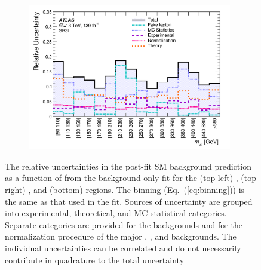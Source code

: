 \begin{figure}[h]
\begin{subfigure}[b]{0.49\textwidth}
      \caption{}
      \label{fig:systSR4l}
    \end{subfigure}
    \hfill
    \begin{subfigure}[b]{0.49\textwidth}
      \centering
      \includegraphics[width=0.98\textwidth]{figs/rpvthreel/systsflat_dist_SROL3l.png}
      \caption{}
      \label{fig:systSR3l}
    \end{subfigure}
    \caption[The relative uncertainties in the post-fit SM background prediction as a function of \mZl from the background-only fit for the (top left) \SRTL, (top right) \SRFour, and (bottom) \SRThree regions.]{The relative uncertainties in the post-fit SM background prediction as a function of \mZl from the background-only fit for the (top left) \SRTL, (top right) \SRFour, and (bottom) \SRThree regions.
    The \mZl binning (Eq.~(\ref{eq:binning})) is the same as that used in the fit.
    Sources of uncertainty are grouped into experimental, theoretical, and MC statistical categories.
    Separate categories are provided for the \fake backgrounds and for the normalization procedure of the major \WZ, \ZZ, and \ttZ backgrounds.
    The individual uncertainties can be correlated and do not necessarily contribute in quadrature to the total uncertainty \cite{ATLAS:2020uer}}
    \label{fig:systematics}
\end{figure}
